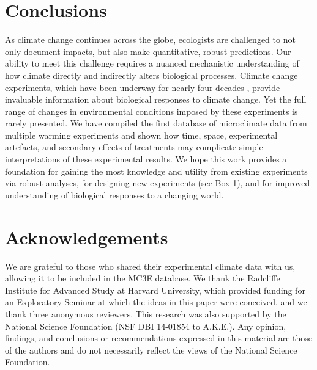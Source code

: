 \documentclass{article}
\begin{document}
\section* {Conclusions}
\par As climate change continues across the globe, ecologists are challenged to not only document impacts, but also make quantitative, robust predictions. Our ability to meet this challenge requires a nuanced mechanistic understanding of how climate directly and indirectly alters biological processes. Climate change experiments, which have been underway for nearly four decades \citep[e.g.,][]{tamaki1981,carlson1982,melillo2017}, provide invaluable information about biological responses to climate change. Yet the full range of changes in environmental conditions imposed by these experiments is rarely presented. We have compiled the first database of microclimate data from multiple warming experiments and shown how time, space, experimental artefacts, and secondary effects of treatments may complicate simple interpretations of these experimental results. We hope this work provides a foundation for gaining the most knowledge and utility from existing experiments via robust analyses, for designing new experiments (see Box 1), and for improved understanding of biological responses to a changing world.

 \section* {Acknowledgements}
We are grateful to those who shared their experimental climate data with us, allowing it to be included in the MC3E database. We thank the Radcliffe Institute for Advanced Study at Harvard University, which provided funding for an Exploratory Seminar at which the ideas in this paper were conceived, and we thank three anonymous reviewers. This research was also supported by the National Science Foundation (NSF DBI 14-01854 to A.K.E.). Any opinion, findings, and conclusions or recommendations expressed in this material are those of the authors and do not necessarily reflect the views of the National Science Foundation.
\end{document}

